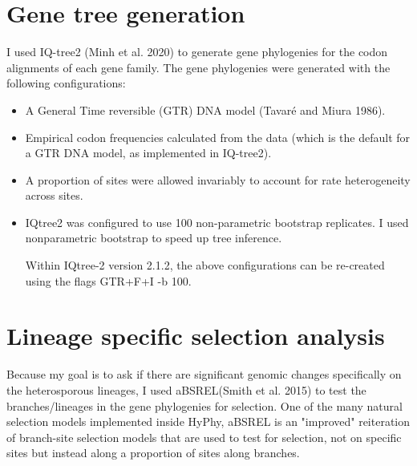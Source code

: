 \section{Gene tree generation}
I used IQ-tree2 (Minh et al. 2020) to generate gene phylogenies for the codon alignments of each gene family. The gene phylogenies were generated with the following configurations:
\begin{itemize}

	\item A General Time reversible (GTR) DNA model (Tavaré and Miura 1986).
	\item Empirical codon frequencies calculated from the data  (which is the default for a GTR DNA model, as implemented in IQ-tree2).
	\item A proportion of sites were allowed invariably to account for rate heterogeneity across sites. 
	\item IQtree2 was configured to use 100 non-parametric bootstrap replicates. I used nonparametric bootstrap to speed up tree inference.

Within IQtree-2 version 2.1.2, the above configurations can be re-created using the flags GTR+F+I -b 100.
\end{itemize}

\section{Lineage specific selection analysis}

Because my goal is to ask if there are significant genomic changes specifically on the heterosporous lineages, I used aBSREL(Smith et al. 2015) to test the branches/lineages in the gene phylogenies for selection. One of the many natural selection models implemented inside HyPhy, aBSREL is an "improved" reiteration of branch-site selection models that are used to test for selection, not on specific sites but instead along a proportion of sites along branches.
